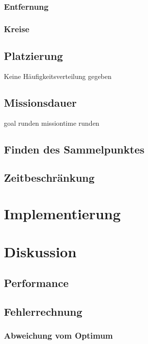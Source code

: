 \documentclass{article}
\begin{document}
\subsubsection{Entfernung}


\subsubsection{Kreise}


\subsection{Platzierung}

Keine Häufigkeitsverteilung gegeben

\subsection{Missionsdauer}

goal runden
missiontime runden

\subsection{Finden des Sammelpunktes}

\subsection{Zeitbeschränkung}

\clearpage
\section{Implementierung}


\clearpage
\section{Diskussion}

\subsection{Performance}

\subsection{Fehlerrechnung}

\subsubsection{Abweichung vom Optimum}
\end{document}
